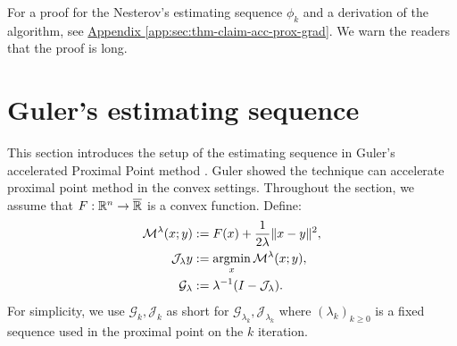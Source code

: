 \documentclass[12pt]{article}
\begin{document}

    For a proof for the Nesterov's estimating sequence $\phi_k$ and a derivation of the algorithm, see
    \hyperref[app:sec:thm-claim-acc-prox-grad]{Appendix \ref*{app:sec:thm-claim-acc-prox-grad}}. 
    We warn the readers that the proof is long. 

\section{Guler's estimating sequence}
    This section introduces the setup of the estimating sequence in Guler's accelerated Proximal Point method \cite{guler_new_1992}. 
    Guler showed the technique can accelerate proximal point method in the convex settings. 
    Throughout the section, we assume that $F:\mathbb R^n \rightarrow \overline {\mathbb R}$ is a convex function. 
    Define:
    \begin{align*}
        \mathcal M^{\lambda} (x; y) &:= F(x) + \frac{1}{2\lambda}\Vert x - y\Vert^2, 
        \\
        \mathcal J_\lambda y &:= \mathop{\rm argmin}\limits_x \mathcal M^{\lambda} (x; y), 
        \\
        \mathcal G_\lambda &:= \lambda^{-1}(I - \mathcal J_\lambda). 
    \end{align*}
    For simplicity, we use $\mathcal G_k, \mathcal J_k$ as short for $\mathcal G_{\lambda_k}, \mathcal J_{\lambda_k}$ where $(\lambda_k)_{k \ge 0}$ is a fixed sequence used in the proximal point on the $k$ iteration. 
    
\end{document}
